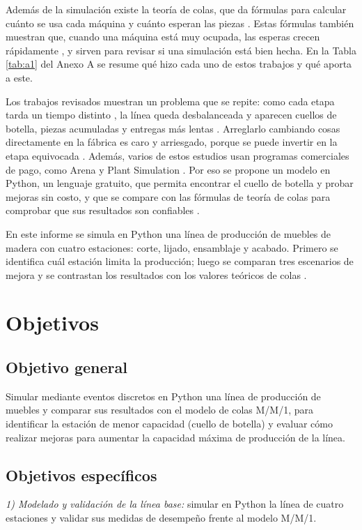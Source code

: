 \documentclass[conference,a4paper]{IEEEtran}
\begin{document}
Además de la simulación existe la teoría de colas, que da fórmulas para calcular cuánto se
usa cada máquina y cuánto esperan las piezas \cite{govil1999}. Estas fórmulas también
muestran que, cuando una máquina está muy ocupada, las esperas crecen rápidamente
\cite{wu2012}, y sirven para revisar si una simulación está bien hecha. En la Tabla
\ref{tab:a1} del Anexo A se resume qué hizo cada uno de estos trabajos y qué aporta a este.

Los trabajos revisados muestran un problema que se repite: como cada etapa tarda un tiempo
distinto \cite{nouri2019,bambura2020}, la línea queda desbalanceada y aparecen cuellos de
botella, piezas acumuladas y entregas más lentas \cite{matrani2026,velumani2017}. Arreglarlo
cambiando cosas directamente en la fábrica es caro y arriesgado, porque se puede invertir en
la etapa equivocada \cite{li2020,negahban2014,mourtzis2020}. Además, varios de estos
estudios usan programas comerciales de pago, como Arena \cite{nouri2019,matrani2026} y Plant
Simulation \cite{bambura2020,li2020}. Por eso se propone un modelo en Python, un lenguaje
gratuito, que permita encontrar el cuello de botella y probar mejoras sin costo, y que se
compare con las fórmulas de teoría de colas para comprobar que sus resultados son confiables
\cite{govil1999,wu2012}.

En este informe se simula en Python una línea de producción de muebles de madera con cuatro
estaciones: corte, lijado, ensamblaje y acabado. Primero se identifica cuál estación limita
la producción; luego se comparan tres escenarios de mejora y se contrastan los resultados con
los valores teóricos de colas \cite{govil1999,wu2012}.

\section{Objetivos}
\subsection{Objetivo general}
Simular mediante eventos discretos en Python una línea de producción de muebles y comparar
sus resultados con el modelo de colas M/M/1, para identificar la estación de menor capacidad
(cuello de botella) y evaluar cómo realizar mejoras para aumentar la capacidad máxima de
producción de la línea.

\subsection{Objetivos específicos}
\textit{1) Modelado y validación de la línea base:} simular en Python la línea de cuatro
estaciones y validar sus medidas de desempeño frente al modelo M/M/1.
\end{document}
